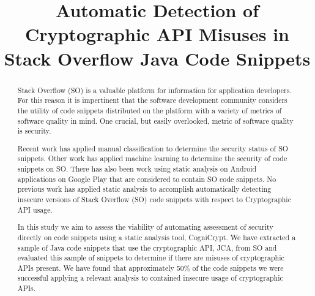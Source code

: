 \documentclass[10pt, conference]{IEEEtran}
\begin{document}
\title{Automatic Detection of Cryptographic API Misuses in Stack Overflow Java Code Snippets\\}

\author{
}



\maketitle

\begin{abstract}
Stack Overflow (SO) is a valuable platform for information for application developers. For this reason it is impertinent that the software development community considers the utility of code snippets distributed on the platform with a variety of metrics of software quality in mind. One crucial, but easily overlooked, metric of software quality is security. 

Recent work has applied manual classification to determine the security status of SO snippets. Other  work has applied machine learning to determine the security of code snippets on SO. There has also been work using static analysis on Android applications on Google Play that are considered to contain SO code snippets. No previous work has applied static analysis to accomplish automatically detecting insecure versions of Stack Overflow (SO) code snippets with respect to Cryptographic API usage.

In this study we aim to assess the viability of automating assessment of security directly on code snippets using a static analysis tool, CogniCrypt. We have extracted a sample of Java code snippets that use the cryptographic API, JCA, from SO and evaluated this sample of snippets to determine if there are misuses of cryptographic APIs present. We have found that approximately 50\% of the code snippets we were successful applying a relevant analysis to contained insecure usage of cryptographic APIs. 
\end{abstract}
\end{document}
